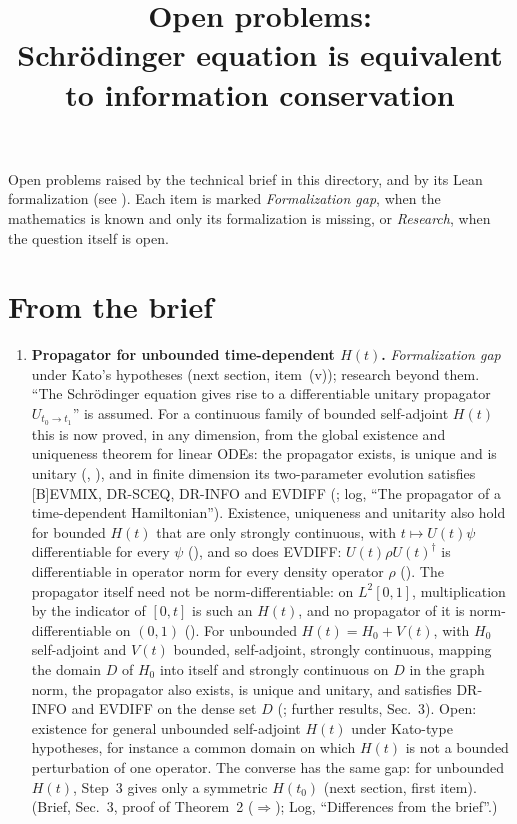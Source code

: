 \documentclass[11pt]{article}
\title{Open problems:\\ Schr\"odinger equation is equivalent to information conservation}
\author{}
\date{}
\begin{document}
\maketitle

\noindent
Open problems raised by the technical brief in this directory, and by its Lean formalization
(see ).
Each item is marked \emph{Formalization gap}, when the mathematics is known and only its
formalization is missing, or \emph{Research}, when the question itself is open.

\section*{From the brief}
\begin{enumerate}
\item \textbf{Propagator for unbounded time-dependent $H(t)$.} \emph{Formalization
  gap} under Kato's hypotheses (next section, item~(v)); research beyond them. ``The Schr\"odinger equation
  gives rise to a differentiable unitary propagator $U_{t_0\to t_1}$'' is assumed. For a
  continuous family of bounded self-adjoint $H(t)$ this is now proved, in any dimension, from
  the global existence and uniqueness theorem for linear ODEs: the propagator exists, is unique
  and is unitary (, ), and in finite
  dimension its two-parameter evolution satisfies [B]EVMIX, DR-SCEQ, DR-INFO and EVDIFF
  (; log, ``The propagator of a time-dependent
  Hamiltonian''). Existence, uniqueness and unitarity also hold for bounded $H(t)$ that are only
  strongly continuous, with $t \mapsto U(t)\psi$ differentiable for every $\psi$
  (), and so does EVDIFF: $U(t)\rho U(t)^\dagger$ is
  differentiable in operator norm for every density operator $\rho$
  (). The propagator itself need not be
  norm-differentiable: on $L^2[0,1]$, multiplication by the indicator of $[0,t]$ is such an
  $H(t)$, and no propagator of it is norm-differentiable on $(0,1)$
  (). For unbounded $H(t) = H_0 + V(t)$, with $H_0$
  self-adjoint and $V(t)$ bounded, self-adjoint, strongly continuous, mapping the domain $D$ of
  $H_0$ into itself and strongly continuous on $D$ in the graph norm, the propagator also
  exists, is unique and unitary, and satisfies DR-INFO and EVDIFF on the dense set $D$
  (; further results, Sec.~3). Open: existence
  for general unbounded self-adjoint $H(t)$ under Kato-type hypotheses, for instance a common
  domain on which $H(t)$ is not a bounded perturbation of one operator. The converse has the
  same gap: for unbounded $H(t)$, Step~3 gives only a symmetric $H(t_0)$ (next section, first
  item). (Brief, Sec.~3, proof of Theorem~2 ($\Rightarrow$); Log, ``Differences from the
  brief''.)
\end{enumerate}
\end{document}

